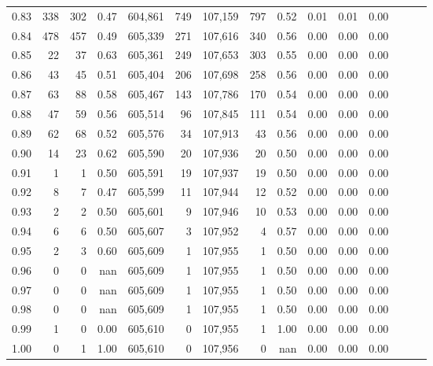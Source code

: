 \begin{tabular}{rrrrrrrrrrrrrrr}
0.83 &     338 &    302 &  0.47 &  604,861 &      749 &  107,159 &      797 &  0.52 &  0.01 &  0.01 &      0.00 \\
0.84 &     478 &    457 &  0.49 &  605,339 &      271 &  107,616 &      340 &  0.56 &  0.00 &  0.00 &      0.00 \\
0.85 &      22 &     37 &  0.63 &  605,361 &      249 &  107,653 &      303 &  0.55 &  0.00 &  0.00 &      0.00 \\
0.86 &      43 &     45 &  0.51 &  605,404 &      206 &  107,698 &      258 &  0.56 &  0.00 &  0.00 &      0.00 \\
0.87 &      63 &     88 &  0.58 &  605,467 &      143 &  107,786 &      170 &  0.54 &  0.00 &  0.00 &      0.00 \\
0.88 &      47 &     59 &  0.56 &  605,514 &       96 &  107,845 &      111 &  0.54 &  0.00 &  0.00 &      0.00 \\
0.89 &      62 &     68 &  0.52 &  605,576 &       34 &  107,913 &       43 &  0.56 &  0.00 &  0.00 &      0.00 \\
0.90 &      14 &     23 &  0.62 &  605,590 &       20 &  107,936 &       20 &  0.50 &  0.00 &  0.00 &      0.00 \\
0.91 &       1 &      1 &  0.50 &  605,591 &       19 &  107,937 &       19 &  0.50 &  0.00 &  0.00 &      0.00 \\
0.92 &       8 &      7 &  0.47 &  605,599 &       11 &  107,944 &       12 &  0.52 &  0.00 &  0.00 &      0.00 \\
0.93 &       2 &      2 &  0.50 &  605,601 &        9 &  107,946 &       10 &  0.53 &  0.00 &  0.00 &      0.00 \\
0.94 &       6 &      6 &  0.50 &  605,607 &        3 &  107,952 &        4 &  0.57 &  0.00 &  0.00 &      0.00 \\
0.95 &       2 &      3 &  0.60 &  605,609 &        1 &  107,955 &        1 &  0.50 &  0.00 &  0.00 &      0.00 \\
0.96 &       0 &      0 &   nan &  605,609 &        1 &  107,955 &        1 &  0.50 &  0.00 &  0.00 &      0.00 \\
0.97 &       0 &      0 &   nan &  605,609 &        1 &  107,955 &        1 &  0.50 &  0.00 &  0.00 &      0.00 \\
0.98 &       0 &      0 &   nan &  605,609 &        1 &  107,955 &        1 &  0.50 &  0.00 &  0.00 &      0.00 \\
0.99 &       1 &      0 &  0.00 &  605,610 &        0 &  107,955 &        1 &  1.00 &  0.00 &  0.00 &      0.00 \\
1.00 &       0 &      1 &  1.00 &  605,610 &        0 &  107,956 &        0 &   nan &  0.00 &  0.00 &      0.00 \\
\bottomrule
\end{tabular}
